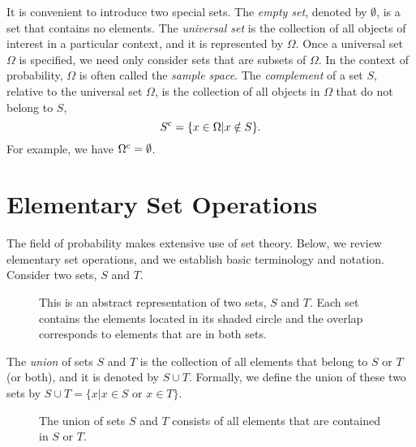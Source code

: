It is convenient to introduce two special sets.
The \emph{empty set}, denoted by $\emptyset$, is a set that contains no elements.
The \emph{universal set} is the collection of all objects of interest in a particular context, and it is represented by $\Omega$.
Once a universal set $\Omega$ is specified, we need only consider sets that are subsets of $\Omega$.
In the context of probability, $\Omega$ is often called the \emph{sample space}.
The \emph{complement} of a set $S$, relative to the universal set $\Omega$, is the collection of all objects in $\Omega$ that do not belong to $S$,
\begin{equation*}
S^{\mathrm{c}} = \{ x \in \Omega | x \notin S \}.
\end{equation*}
For example, we have $\Omega^{\mathrm{c}} = \emptyset$.


\section{Elementary Set Operations}

The field of probability makes extensive use of set theory.
Below, we review elementary set operations, and we establish basic terminology and notation.
Consider two sets, $S$ and $T$.

\begin{figure}[htb!]
\begin{center}
\caption{This is an abstract representation of two sets, $S$ and $T$.
Each set contains the elements located in its shaded circle and the overlap corresponds to elements that are in both sets.}
\end{center}
\end{figure}

The \emph{union} of sets $S$ and $T$ is the collection of all elements that belong to $S$ or $T$ (or both), and it is denoted by $S \cup T$.
Formally, we define the union of these two sets by $S \cup T = \{ x | x \in S \text{ or } x \in T \}$.

\begin{figure}[htb!]
\begin{center}
\caption{The union of sets $S$ and $T$ consists of all elements that are contained in $S$ or $T$.}
\end{center}
\end{figure}

